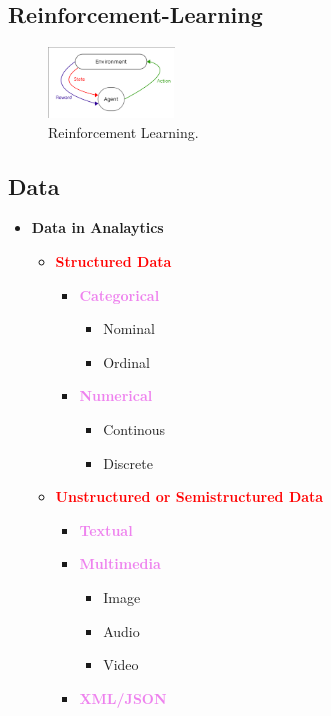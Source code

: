 \documentclass[../MLDM_Main.tex]{subfiles}
\begin{document}
\subsection{Reinforcement-Learning}
\begin{figure}[H]
\centering
\includegraphics[width=0.3\textwidth]{images/ReinforcementLearning.png}
\caption{\label{fig:Reinforcement Learning}Reinforcement Learning.}
\end{figure}
\newpage
\subsection{Data}
\begin{itemize}
	\item \textbf{Data in Analaytics}
	\begin{itemize}
		\item \textcolor{red}{\textbf{Structured Data}}
		\begin{itemize}
			\item \textcolor{violet}{\textbf{Categorical}}
			\begin{itemize}
				\item Nominal
				\item Ordinal
			\end{itemize}
			\item \textcolor{violet}{\textbf{Numerical}}
			\begin{itemize}
				\item Continous
				\item Discrete
			\end{itemize}
			
		\end{itemize}				
		\item \textcolor{red}{\textbf{Unstructured or Semistructured Data}}
		\begin{itemize}
			\item \textcolor{violet}{\textbf{Textual}}
			\item \textcolor{violet}{\textbf{Multimedia}}
			\begin{itemize}
				\item Image
				\item Audio
				\item Video
			\end{itemize}
			\item \textcolor{violet}{\textbf{XML/JSON}}
		\end{itemize}
	\end{itemize}
\end{itemize}
\end{document}

